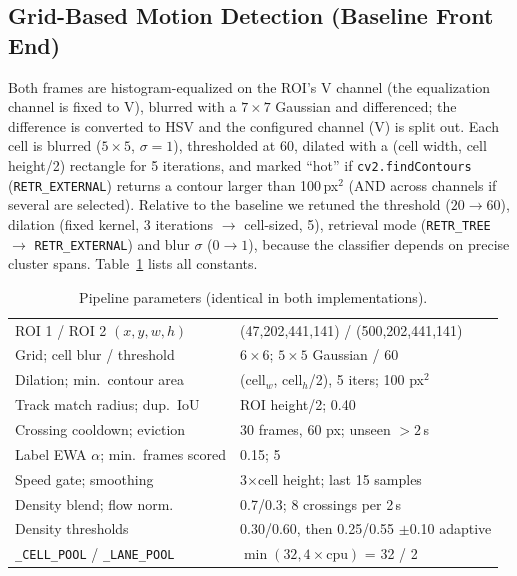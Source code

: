 \documentclass[conference]{IEEEtran}
\newcommand{\code}[1]{\texttt{#1}}
\begin{document}
\subsection{Grid-Based Motion Detection (Baseline Front End)}
\label{sec:motion}
Both frames are histogram-equalized on the ROI's V channel (the
equalization channel is fixed to V), blurred with a $7\times7$ Gaussian
and differenced; the difference is converted to HSV and the configured
channel (V) is split out. Each cell is blurred ($5\times5$, $\sigma{=}1$),
thresholded at 60, dilated with a (cell width, cell height/2) rectangle
for 5 iterations, and marked ``hot'' if \code{cv2.findContours}
(\code{RETR\_EXTERNAL}) returns a contour larger than 100\,px$^2$ (AND
across channels if several are selected). Relative to the baseline we
retuned the threshold ($20\to60$), dilation (fixed kernel, 3
iterations $\to$ cell-sized, 5), retrieval mode (\code{RETR\_TREE} $\to$
\code{RETR\_EXTERNAL}) and blur $\sigma$ ($0\to1$), because the classifier
depends on precise cluster spans. Table~\ref{tab:params} lists all
constants.

\begin{table}[t]
\centering
\caption{Pipeline parameters (identical in both implementations).}
\label{tab:params}
\scriptsize
\setlength{\tabcolsep}{3pt}
\begin{tabular}{ll}
\toprule
ROI 1 / ROI 2 $(x,y,w,h)$ & (47,202,441,141) / (500,202,441,141) \\
Grid; cell blur / threshold & $6\times6$; $5\times5$ Gaussian / 60 \\
Dilation; min.\ contour area & (cell$_w$, cell$_h$/2), 5 iters; 100 px$^2$ \\
Track match radius; dup.\ IoU & ROI height/2; 0.40 \\
Crossing cooldown; eviction & 30 frames, 60 px; unseen $>2$\,s \\
Label EWA $\alpha$; min.\ frames scored & 0.15; 5 \\
Speed gate; smoothing & 3$\times$cell height; last 15 samples \\
Density blend; flow norm. & 0.7/0.3; 8 crossings per 2\,s \\
Density thresholds & 0.30/0.60, then 0.25/0.55 $\pm$0.10 adaptive \\
\code{\_CELL\_POOL} / \code{\_LANE\_POOL} & $\min(32,4{\times}\text{cpu})$ = 32 / 2 \\
\bottomrule
\end{tabular}
\end{table}
\end{document}

